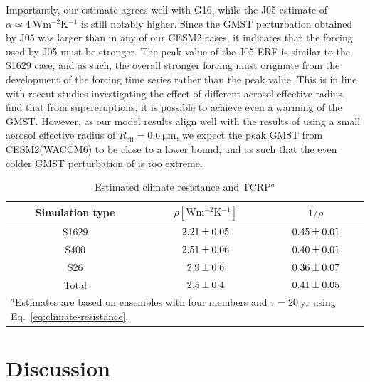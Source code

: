 \documentclass[draft]{agujournal2019}
\begin{document}
  Importantly, our estimate agrees well with G16, while the J05 estimate of \(\alpha
  \simeq \SI{4}{\watt\metre^{-2}\kelvin^{-1}}\) is still notably higher. Since the GMST
  perturbation obtained by J05 was larger than in any of our CESM2 cases, it indicates
  that the forcing used by J05 must be stronger.  The peak value
  of the J05 ERF is similar to the S1629 case, and as such, the overall stronger forcing
  must originate from the development of the forcing time series rather than the peak
  value. This is in line with recent studies investigating the effect of different
  aerosol effective radius.  find that from supereruptions, it is
  possible to achieve even a warming of the GMST. However, as our model results align
  well with the results of  using a small aerosol effective radius of
  \(R_{\mathrm{eff}}=\SI{0.6}{\micro\meter}\), we expect the peak GMST from
  CESM2(WACCM6) to be close to a lower bound, and as such that the even colder GMST
  perturbation of  is too extreme.

  \begin{table}
    \centering

    \caption{Estimated climate resistance and TCRP\(^{a}\)}\label{tab:trcp}%
    \begin{tabular}{ccc}
      \toprule
      Simulation type & \(\rho [\si{\watt\metre^{-2}\kelvin^{-1}}]\) & \(1/\rho\) \\
      \midrule
      S1629 & \(\num{2.21\pm0.05}\) & \(\num{0.45\pm0.01}\) \\
      S400 & \(\num{2.51\pm0.06}\) & \(\num{0.40\pm0.01}\) \\
      S26 & \(\num{2.9\pm0.6}\) & \(\num{0.36\pm0.07}\) \\
      Total & \(\num{2.5\pm0.4}\) & \(\num{0.41\pm0.05}\) \\
      \toprule
      \multicolumn{3}{l}{\parbox{\linewidth}{\(^{a}\)Estimates are based on ensembles with four members and \(\tau
          =\SI{20}{\mathrm{yr}}\) using Eq.~\ref{eq:climate-resistance}.}} \\
    \end{tabular}
  \end{table}

  \section{Discussion}

  \label{sec:discussion}
\end{document}
